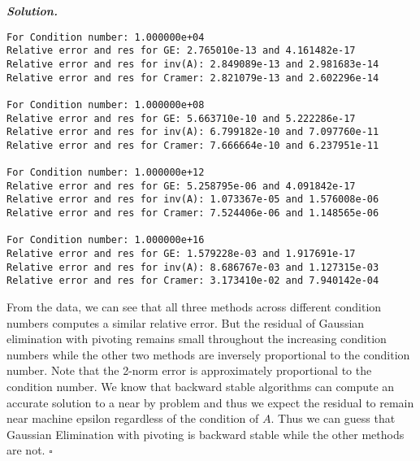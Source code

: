\documentclass[12pt]{report}
\newenvironment{solution}[1][\it{Solution}]{\textbf{#1. } }{$\square$}
\begin{document}
\begin{solution}
\begin{verbatim}
For Condition number: 1.000000e+04 
Relative error and res for GE: 2.765010e-13 and 4.161482e-17 
Relative error and res for inv(A): 2.849089e-13 and 2.981683e-14 
Relative error and res for Cramer: 2.821079e-13 and 2.602296e-14 

For Condition number: 1.000000e+08 
Relative error and res for GE: 5.663710e-10 and 5.222286e-17 
Relative error and res for inv(A): 6.799182e-10 and 7.097760e-11 
Relative error and res for Cramer: 7.666664e-10 and 6.237951e-11 

For Condition number: 1.000000e+12 
Relative error and res for GE: 5.258795e-06 and 4.091842e-17 
Relative error and res for inv(A): 1.073367e-05 and 1.576008e-06 
Relative error and res for Cramer: 7.524406e-06 and 1.148565e-06 

For Condition number: 1.000000e+16 
Relative error and res for GE: 1.579228e-03 and 1.917691e-17 
Relative error and res for inv(A): 8.686767e-03 and 1.127315e-03 
Relative error and res for Cramer: 3.173410e-02 and 7.940142e-04 
    \end{verbatim}

    \noindent
    From the data, we can see that all three methods across different condition numbers computes a similar relative error. But the residual of Gaussian elimination with pivoting remains small throughout the increasing condition numbers while the other two methods are inversely proportional to the condition number. Note that the 2-norm error is approximately proportional to the condition number. We know that backward stable algorithms can compute an accurate solution to a near by problem and thus we expect the residual to remain near machine epsilon regardless of the condition of $A$. Thus we can guess that Gaussian Elimination with pivoting is backward stable while the other methods are not. 
\end{solution}

\newpage


\end{document}
